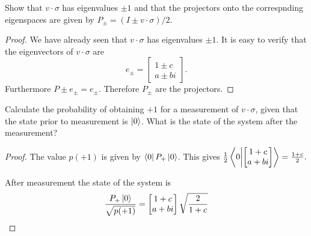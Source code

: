 \documentclass{article}
\begin{document}
\begin{exercise}
  Show that $v\cdot\sigma$ has eigenvalues $\pm1$ and that the projectors onto the correspnding eigenspaces are given by $P_\pm=(I\pm v\cdot\sigma)/2$.
  \begin{proof}
    We have already seen that $v\cdot\sigma$ has eigenvalues $\pm1$. It is easy to verify that the eigenvectors of $v\cdot\sigma$ are
    \[e_\pm=\begin{bmatrix}
      1\pm c \\
      a\pm bi
    \end{bmatrix}.\]
    Furthermore $P\pm e_\pm = e_\pm.$ Therefore $P_\pm$ are the projectors.
  \end{proof}
\end{exercise}

\begin{exercise}
  Calculate the probability of obtaining $+1$ for a measurement of $v\cdot\sigma$, given that the state prior to measurement is $\ket0$. What is the state of the system after the measurement?
  \begin{proof}
    The value $p(+1)$ is given by $\bra0P_+\ket0$. This gives
  $\frac{1}{2}\bra0\ket{\begin{bmatrix}
    1+c \\
    a+bi
  \end{bmatrix}}=\frac{1+c}{2}.$

  After measurement the state of the system is \[\frac{P_+\ket0}{\sqrt{p(+1)}}=\begin{bmatrix}
    1+c \\
    a+bi
  \end{bmatrix}\sqrt\frac{2}{1+c}\]
  \end{proof}
\end{exercise}
\end{document}
